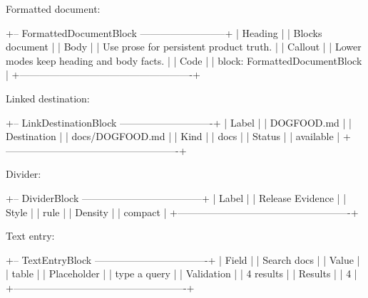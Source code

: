 Formatted document:

\begin{CodeBlock}
+-- FormattedDocumentBlock --------------------------+
| Heading                                            |
|   Blocks document                                  |
| Body                                               |
|   Use prose for persistent product truth.          |
| Callout                                            |
|   Lower modes keep heading and body facts.         |
| Code                                               |
|   block: FormattedDocumentBlock                    |
+----------------------------------------------------+
\end{CodeBlock}

Linked destination:

\begin{CodeBlock}
+-- LinkDestinationBlock ----------------------------+
| Label                                              |
|   DOGFOOD.md                                       |
| Destination                                        |
|   docs/DOGFOOD.md                                  |
| Kind                                               |
|   docs                                             |
| Status                                             |
|   available                                        |
+----------------------------------------------------+
\end{CodeBlock}

Divider:

\begin{CodeBlock}
+-- DividerBlock ------------------------------------+
| Label                                              |
|   Release Evidence                                 |
| Style                                              |
|   rule                                             |
| Density                                            |
|   compact                                          |
+----------------------------------------------------+
\end{CodeBlock}

Text entry:

\begin{CodeBlock}
+-- TextEntryBlock ----------------------------------+
| Field                                              |
|   Search docs                                      |
| Value                                              |
|   table                                            |
| Placeholder                                        |
|   type a query                                     |
| Validation                                         |
|   4 results                                        |
| Results                                            |
|   4                                                |
+----------------------------------------------------+
\end{CodeBlock}

